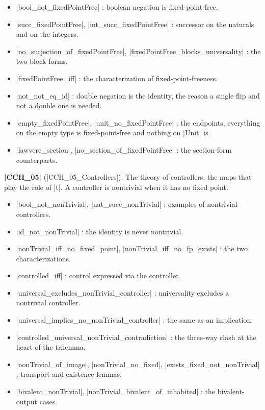 \documentclass{memoir}
\begin{document}
\begin{itemize}
\item \LeanVerb|bool_not_fixedPointFree| : boolean negation is fixed-point-free.
\item \LeanVerb|succ_fixedPointFree|, \LeanVerb|int_succ_fixedPointFree| : successor on the naturals and
   on the integers.
\item \LeanVerb|no_surjection_of_fixedPointFree|, \LeanVerb|fixedPointFree_blocks_universality| : the two
   block forms.
\item \LeanVerb|fixedPointFree_iff| : the characterization of fixed-point-freeness.
\item \LeanVerb|not_not_eq_id| : double negation is the identity, the reason a single flip and
   not a double one is needed.
\item \LeanVerb|empty_fixedPointFree|, \LeanVerb|unit_no_fixedPointFree| : the endpoints, everything on
   the empty type is fixed-point-free and nothing on \LeanVerb|Unit| is.
\item \LeanVerb|lawvere_section|, \LeanVerb|no_section_of_fixedPointFree| : the section-form
   counterparts.

\end{itemize}


\textbf{\LeanVerb|CCH_05|} (\LeanVerb|CCH_05_Controllers|). The theory of controllers, the maps that play the
role of \LeanVerb|t|. A controller is nontrivial when it has no fixed point.

\begin{itemize}
\item \LeanVerb|bool_not_nonTrivial|, \LeanVerb|nat_succ_nonTrivial| : examples of nontrivial
   controllers.
\item \LeanVerb|id_not_nonTrivial| : the identity is never nontrivial.
\item \LeanVerb|nonTrivial_iff_no_fixed_point|, \LeanVerb|nonTrivial_iff_no_fp_exists| : the two
   characterizations.
\item \LeanVerb|controlled_iff| : control expressed via the controller.
\item \LeanVerb|universal_excludes_nonTrivial_controller| : universality excludes a nontrivial
   controller.
\item \LeanVerb|universal_implies_no_nonTrivial_controller| : the same as an implication.
\item \LeanVerb|controlled_universal_nonTrivial_contradiction| : the three-way clash at the
   heart of the trilemma.
\item \LeanVerb|nonTrivial_of_image|, \LeanVerb|nonTrivial_no_fixed|, \LeanVerb|exists_fixed_not_nonTrivial| :
   transport and existence lemmas.
\item \LeanVerb|bivalent_nonTrivial|, \LeanVerb|nonTrivial_bivalent_of_inhabited| : the bivalent-output
   cases.

\end{itemize}
\end{document}
